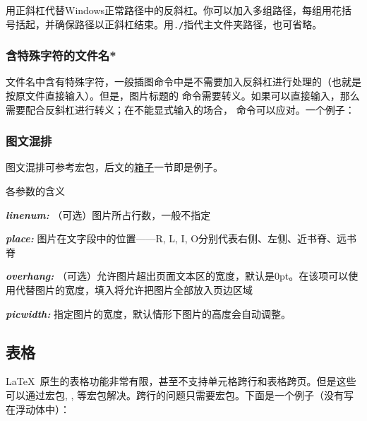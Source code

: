用正斜杠代替Windows正常路径中的反斜杠。你可以加入多组路径，每组用花括号括起，并确保路径以正斜杠结束。用\verb|./|指代主文件夹路径，也可省略。\dpar

\subsubsection{含特殊字符的文件名*}
文件名中含有特殊字符，一般插图命令中是不需要加入反斜杠进行处理的（也就是按原文件直接输入）。但是，图片标题的  命令需要转义。如果可以直接输入，那么需要配合反斜杠进行转义；在不能显式输入的场合，  命令可以应对。一个例子：
\begin{latex}
\end{latex}

\subsubsection{图文混排}
图文混排可参考宏包，后文的\hyperref[sec:box]{箱子}一节即是例子。
\begin{latex}
\end{latex}

各参数的含义
\begin{inlinee}
\item {\bfseries\itshape linenum:} （可选）图片所占行数，一般不指定
\item {\bfseries\itshape place:} 图片在文字段中的位置——R, L, I, O分别代表右侧、左侧、近书脊、远书脊
\item {\bfseries\itshape overhang:} （可选）允许图片超出页面文本区的宽度，默认是0pt。在该项可以使用代替图片的宽度，填入将允许把图片全部放入页边区域
\item {\bfseries\itshape picwidth:} 指定图片的宽度，默认情形下图片的高度会自动调整。
\end{inlinee}

\subsection{表格}
\LaTeX\ 原生的表格功能非常有限，甚至不支持单元格跨行和表格跨页。但是这些可以通过宏包, , 等宏包解决。跨行的问题只需要宏包。下面是一个例子（没有写在浮动体中）：

